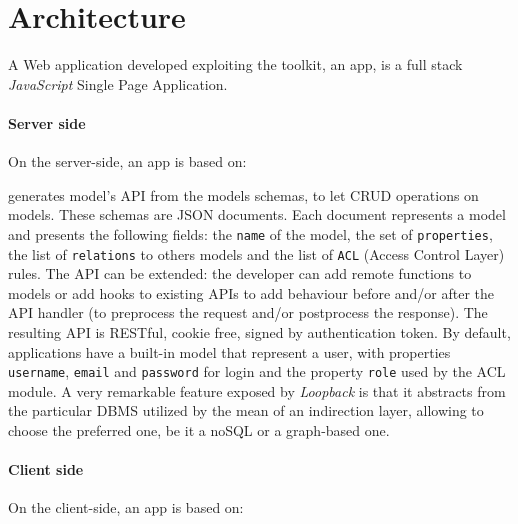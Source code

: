 \section{Architecture}\label{sec:architecture}

A Web application developed exploiting the  toolkit, an  app, is a full stack {\em JavaScript} Single Page Application.

\paragraph{Server side}

On the server-side, an  app is based on:

\begin{description}
\itemsep1pt\parskip0pt
\item[StrongLoop LoopBack] generates model’s API from the models schemas, to let CRUD operations on models.
These schemas are JSON documents. Each document represents a model and presents the following fields: the \texttt{name} of the model, the set of \texttt{properties}, the list of \texttt{relations} to others models and the list of \texttt{ACL} (Access Control Layer) rules. 
The API can be extended: the developer can add remote functions to models or add hooks to existing APIs to add behaviour before and/or after the API handler (to preprocess the request and/or postprocess the response). 
The resulting API is RESTful, cookie free, signed by authentication token.
By default, applications have a built-in model that represent a user, with properties \texttt{username}, \texttt{email} and \texttt{password} for login and the property \texttt{role} used by the ACL module.
A very remarkable feature exposed by {\em Loopback} is that it abstracts from the particular DBMS utilized by the mean of an indirection layer, allowing to choose the preferred one, be it a noSQL or a graph-based one.
\end{description}

\paragraph{Client side}

On the client-side, an  app is based on:

